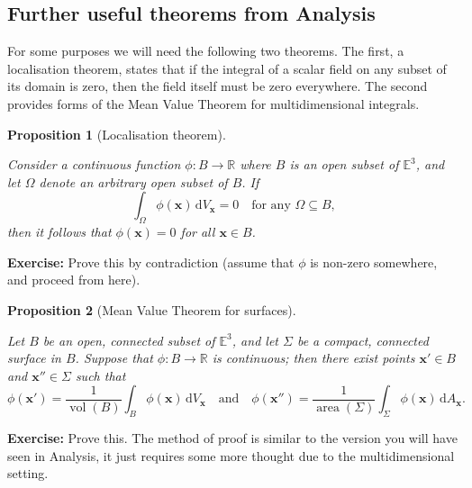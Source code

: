 \documentclass[
  letterpaper,
  DIV=11,
  numbers=noendperiod]{scrreprt}
\theoremstyle{plain}
\newtheorem{proposition}{Proposition}[chapter]
\theoremstyle{remark}
\begin{document}
\subsection{Further useful theorems from
Analysis}\label{further-useful-theorems-from-analysis}

For some purposes we will need the following two theorems. The first, a
localisation theorem, states that if the integral of a scalar field on
any subset of its domain is zero, then the field itself must be zero
everywhere. The second provides forms of the Mean Value Theorem for
multidimensional integrals.

\begin{proposition}[Localisation
theorem]\protect\hypertarget{prp-localisation}{}\label{prp-localisation}

Consider a continuous function \(\phi:B\to{\mathbb{R}}\) where \(B\) is
an open subset of \({\mathbb{E}}^3\), and let \(\Omega\) denote an
arbitrary open subset of \(B\). If
\[\int_\Omega \phi({\boldsymbol{x}}){\,{\mathrm{d}}V_{{\boldsymbol{x}}}}= 0\quad\text{for any }\Omega\subseteq B,\]
then it follows that \(\phi({\boldsymbol{x}})=0\) for all
\({\boldsymbol{x}}\in B\).

\end{proposition}

\textbf{Exercise:} Prove this by contradiction (assume that \(\phi\) is
non-zero somewhere, and proceed from here).

\begin{proposition}[Mean Value Theorem for
surfaces]\protect\hypertarget{prp-MVTsurfaces}{}\label{prp-MVTsurfaces}

Let \(B\) be an open, connected subset of \({\mathbb{E}}^3\), and let
\(\Sigma\) be a compact, connected surface in \(B\). Suppose that
\(\phi:B\to{\mathbb{R}}\) is continuous; then there exist points
\({\boldsymbol{x}}'\in B\) and \({\boldsymbol{x}}''\in\Sigma\) such that
\[\phi({\boldsymbol{x}}') = \frac{1}{{\operatorname{vol}}(B)}\int_B \phi({\boldsymbol{x}}){\,{\mathrm{d}}V_{{\boldsymbol{x}}}}\quad\text{and}\quad
    \phi({\boldsymbol{x}}'') = \frac{1}{{\operatorname{area}}(\Sigma)}\int_\Sigma \phi({\boldsymbol{x}}){\,{\mathrm{d}}A_{{\boldsymbol{x}}}}.\]

\end{proposition}

\textbf{Exercise:} Prove this. The method of proof is similar to the
version you will have seen in Analysis, it just requires some more
thought due to the multidimensional setting.
\end{document}
